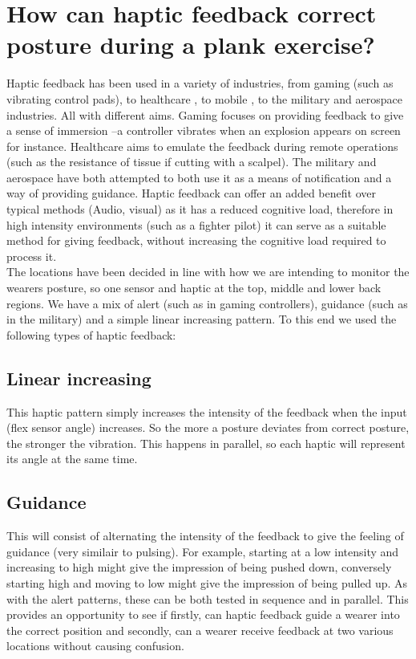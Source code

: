 \documentclass[sigconf]{acmart}
\begin{document}
\section{How can haptic feedback correct posture during a plank exercise?}
Haptic feedback has been used in a variety of industries, from gaming (such as vibrating control pads), to healthcare \cite{bethea2004application}, to mobile \cite{cuartielles2012mobile}, to the military and aerospace industries.  All with different aims. Gaming focuses on providing feedback to give a sense of immersion –a controller vibrates when an explosion appears on screen for instance. Healthcare aims to emulate the feedback during remote operations (such as the resistance of tissue if cutting with a scalpel). The military \cite{immonen2008haptics} and aerospace have both attempted to both use it as a means of notification and a way of providing guidance. Haptic feedback can offer an added benefit over typical methods (Audio, visual) as it has a reduced cognitive load, therefore in high intensity environments (such as a fighter pilot) it can serve as a suitable method for giving feedback, without increasing the cognitive load required to process it.\\

The locations have been decided in line with how we are intending to monitor the wearer\textquotesingle s posture, so one sensor and haptic at the top, middle and lower back regions.
We have a mix of alert (such as in gaming controllers), guidance (such as in the military) and a simple linear increasing pattern. To this end we used the following types of haptic feedback:

\subsection{Linear increasing}
This haptic pattern simply increases the intensity of the feedback when the input (flex sensor angle) increases. So the more a posture deviates from correct posture, the stronger the vibration. This happens in parallel, so each haptic will represent its angle at the same time.

\subsection{Guidance}
This will consist of alternating the intensity of the feedback to give the feeling of guidance (very similair to pulsing). For example, starting at a low intensity and increasing to high might give the impression of being \textquotesingle pushed \textquotesingle down, conversely starting high and moving to low might give the impression of being \textquotesingle pulled \textquotesingle up. As with the alert patterns, these can be both tested in sequence and in parallel. This provides an opportunity to see if firstly, can haptic feedback guide a wearer into the correct position and secondly, can a wearer receive feedback at two various locations without causing confusion.\\
\end{document}
